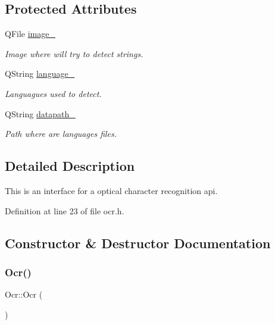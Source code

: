 \subsection*{Protected Attributes}
\begin{DoxyCompactItemize}
\item 
\mbox{\label{classOcr_a731be039b828dfb1c1f3d5efdeaea9aa}} 
Q\+File \mbox{\hyperlink{classOcr_a731be039b828dfb1c1f3d5efdeaea9aa}{image\+\_\+}}
\begin{DoxyCompactList}\small\item\em Image where will try to detect strings. \end{DoxyCompactList}\item 
\mbox{\label{classOcr_ad5f11045f50c9d8a23d2cea235c509ad}} 
Q\+String \mbox{\hyperlink{classOcr_ad5f11045f50c9d8a23d2cea235c509ad}{language\+\_\+}}
\begin{DoxyCompactList}\small\item\em Languagues used to detect. \end{DoxyCompactList}\item 
\mbox{\label{classOcr_a5c13f164c431cb4bc5a487eba75be7b4}} 
Q\+String \mbox{\hyperlink{classOcr_a5c13f164c431cb4bc5a487eba75be7b4}{datapath\+\_\+}}
\begin{DoxyCompactList}\small\item\em Path where are languages files. \end{DoxyCompactList}\end{DoxyCompactItemize}


\subsection{Detailed Description}
This is an interface for a optical character recognition api. 

Definition at line 23 of file ocr.\+h.



\subsection{Constructor \& Destructor Documentation}
\mbox{\label{classOcr_a285da90c44b929a9883a461de3e6578d}} 
\subsubsection{\texorpdfstring{Ocr()}{Ocr()}}
{\footnotesize\ttfamily Ocr\+::\+Ocr (\begin{DoxyParamCaption}{ }\end{DoxyParamCaption})}



